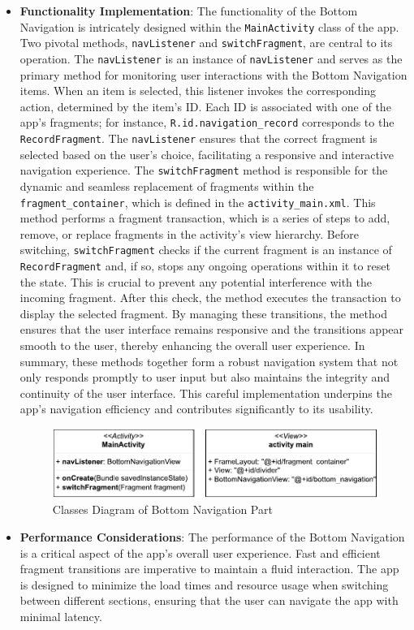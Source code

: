 \documentclass[conference,10pt,letterpaper]{IEEEtran}
\begin{document}
\begin{itemize}
		\item \textbf{Functionality Implementation}:
		The functionality of the Bottom Navigation is intricately designed within the \texttt{MainActivity} class of the app. Two pivotal methods, \texttt{navListener} and \texttt{switchFragment}, are central to its operation. The \texttt{navListener} is an instance of \texttt{navListener} and serves as the primary method for monitoring user interactions with the Bottom Navigation items. When an item is selected, this listener invokes the corresponding action, determined by the item's ID. Each ID is associated with one of the app's fragments; for instance, \texttt{R.id.navigation\_record} corresponds to the \texttt{RecordFragment}. The \texttt{navListener} ensures that the correct fragment is selected based on the user's choice, facilitating a responsive and interactive navigation experience. The \texttt{switchFragment} method is responsible for the dynamic and seamless replacement of fragments within the \texttt{fragment\_container}, which is defined in the \texttt{activity\_main.xml}. This method performs a fragment transaction, which is a series of steps to add, remove, or replace fragments in the activity's view hierarchy. Before switching, \texttt{switchFragment} checks if the current fragment is an instance of \texttt{RecordFragment} and, if so, stops any ongoing operations within it to reset the state. This is crucial to prevent any potential interference with the incoming fragment. After this check, the method executes the transaction to display the selected fragment. By managing these transitions, the method ensures that the user interface remains responsive and the transitions appear smooth to the user, thereby enhancing the overall user experience. In summary, these methods together form a robust navigation system that not only responds promptly to user input but also maintains the integrity and continuity of the user interface. This careful implementation underpins the app's navigation efficiency and contributes significantly to its usability.
		
		\begin{figure}[ht]
			\centering
			\includegraphics[width=5in]{src/main activity.pdf}
			\caption{Classes Diagram of Bottom Navigation Part}
			\label{fig:main_class}
		\end{figure}
		
		\item \textbf{Performance Considerations}:
		The performance of the Bottom Navigation is a critical aspect of the app's overall user experience. Fast and efficient fragment transitions are imperative to maintain a fluid interaction. The app is designed to minimize the load times and resource usage when switching between different sections, ensuring that the user can navigate the app with minimal latency.
	\end{itemize}
	
\end{document}
